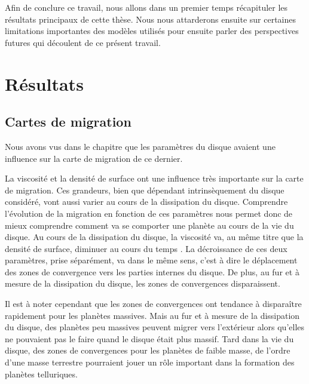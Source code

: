 Afin de conclure ce travail, nous allons dans un premier temps récapituler les résultats principaux de cette thèse. Nous nous attarderons ensuite sur certaines limitations importantes des modèles utilisés pour ensuite parler des perspectives futures qui découlent de ce présent travail. 

\section{Résultats}
\subsection{Cartes de migration}
Nous avons vus dans le chapitre  que les paramètres du disque avaient une influence sur la carte de migration de ce dernier. 

La viscosité et la densité de surface ont une influence très importante sur la carte de migration. Ces grandeurs, bien que dépendant intrinsèquement du disque considéré, vont aussi varier au cours de la dissipation du disque. Comprendre l'évolution de la migration en fonction de ces paramètres nous permet donc de mieux comprendre comment va se comporter une planète au cours de la vie du disque. Au cours de la dissipation du disque, la viscosité va, au même titre que la densité de surface, diminuer au cours du temps \citep[Fig. 16]{guilloteau2011dual}. La décroissance de ces deux paramètres, prise séparément, va dans le même sens, c'est à dire le déplacement des zones de convergence vers les parties internes du disque. De plus, au fur et à mesure de la dissipation du disque, les zones de convergences disparaissent.

Il est à noter cependant que les zones de convergences ont tendance à disparaître rapidement pour les planètes massives. Mais au fur et à mesure de la dissipation du disque, des planètes peu massives peuvent migrer vers l'extérieur alors qu'elles ne pouvaient pas le faire quand le disque était plus massif. Tard dans la vie du disque, des zones de convergences pour les planètes de faible masse, de l'ordre d'une masse terrestre pourraient jouer un rôle important dans la formation des planètes telluriques.

